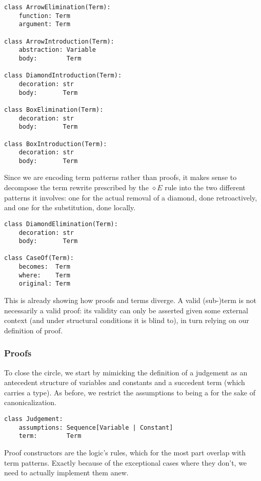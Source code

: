 \begin{verbatim}
class ArrowElimination(Term):
    function: Term
    argument: Term

class ArrowIntroduction(Term):
    abstraction: Variable
    body:        Term

class DiamondIntroduction(Term):
    decoration: str
    body:       Term

class BoxElimination(Term):
    decoration: str
    body:       Term

class BoxIntroduction(Term):
    decoration: str
    body:       Term
\end{verbatim}

\noindent Since we are encoding term patterns rather than proofs, it makes sense to decompose the term rewrite prescribed by the $\diamond E$ rule into the two different patterns it involves: one for the actual removal of a diamond, done retroactively, and one for the substitution, done locally.

\begin{verbatim}
class DiamondElimination(Term):
    decoration: str
    body:       Term

class CaseOf(Term):
    becomes:  Term
    where:    Term
    original: Term
\end{verbatim}

\noindent This is already showing how proofs and terms diverge.
A valid (sub-)term is not necessarily a valid proof:  its validity can only be asserted given some external context (and under structural conditions it is blind to), in turn relying on our definition of proof.

\subsubsection{Proofs}
To close the circle, we start by mimicking the definition of a judgement as an antecedent structure of variables and constants and a succedent term (which carries a type).
As before, we restrict the assumptions to being a  for the sake of canonicalization.

\begin{verbatim}
class Judgement:
    assumptions: Sequence[Variable | Constant]
    term:        Term
\end{verbatim}

\noindent Proof constructors are the logic's rules, which for the most part overlap with term patterns.
Exactly because of the exceptional cases where they don't, we need to actually implement them anew.

